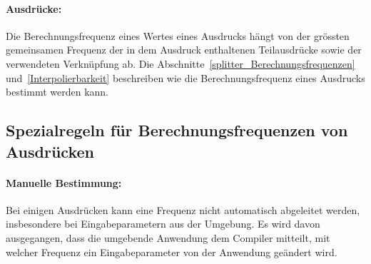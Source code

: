 \paragraph{Ausdrücke:} Die Berechnungsfrequenz eines Wertes eines Ausdrucks hängt von der grössten gemeinsamen Frequenz
der in dem Ausdruck enthaltenen Teilausdrücke sowie der verwendeten Verknüpfung ab.
Die Abschnitte~\ref{splitter_Berechnungsfrequenzen} und~\ref{Interpolierbarkeit} beschreiben wie die Berechnungsfrequenz eines Ausdrucks bestimmt werden kann.

\subsection{Spezialregeln für Berechnungsfrequenzen von Ausdrücken}

\paragraph{Manuelle Bestimmung:}
Bei einigen Ausdrücken kann eine Frequenz nicht automatisch abgeleitet werden, insbesondere bei Eingabeparametern aus der
Umgebung. Es wird davon ausgegangen, dass die umgebende Anwendung dem Compiler mitteilt, mit welcher Frequenz ein Eingabeparameter
von der Anwendung geändert wird.\\


